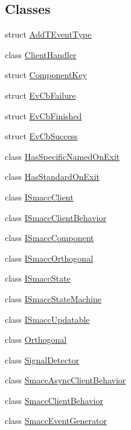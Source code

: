\subsection*{Classes}
\begin{DoxyCompactItemize}
\item 
struct \hyperlink{structsmacc_1_1AddTEventType}{Add\+T\+Event\+Type}
\item 
class \hyperlink{classsmacc_1_1ClientHandler}{Client\+Handler}
\item 
struct \hyperlink{structsmacc_1_1ComponentKey}{Component\+Key}
\item 
struct \hyperlink{structsmacc_1_1EvCbFailure}{Ev\+Cb\+Failure}
\item 
struct \hyperlink{structsmacc_1_1EvCbFinished}{Ev\+Cb\+Finished}
\item 
struct \hyperlink{structsmacc_1_1EvCbSuccess}{Ev\+Cb\+Success}
\item 
class \hyperlink{classsmacc_1_1HasSpecificNamedOnExit}{Has\+Specific\+Named\+On\+Exit}
\item 
class \hyperlink{classsmacc_1_1HasStandardOnExit}{Has\+Standard\+On\+Exit}
\item 
class \hyperlink{classsmacc_1_1ISmaccClient}{I\+Smacc\+Client}
\item 
class \hyperlink{classsmacc_1_1ISmaccClientBehavior}{I\+Smacc\+Client\+Behavior}
\item 
class \hyperlink{classsmacc_1_1ISmaccComponent}{I\+Smacc\+Component}
\item 
class \hyperlink{classsmacc_1_1ISmaccOrthogonal}{I\+Smacc\+Orthogonal}
\item 
class \hyperlink{classsmacc_1_1ISmaccState}{I\+Smacc\+State}
\item 
class \hyperlink{classsmacc_1_1ISmaccStateMachine}{I\+Smacc\+State\+Machine}
\item 
class \hyperlink{classsmacc_1_1ISmaccUpdatable}{I\+Smacc\+Updatable}
\item 
class \hyperlink{classsmacc_1_1Orthogonal}{Orthogonal}
\item 
class \hyperlink{classsmacc_1_1SignalDetector}{Signal\+Detector}
\item 
class \hyperlink{classsmacc_1_1SmaccAsyncClientBehavior}{Smacc\+Async\+Client\+Behavior}
\item 
class \hyperlink{classsmacc_1_1SmaccClientBehavior}{Smacc\+Client\+Behavior}
\item 
class \hyperlink{classsmacc_1_1SmaccEventGenerator}{Smacc\+Event\+Generator}
\item 

\end{DoxyCompactItemize}
